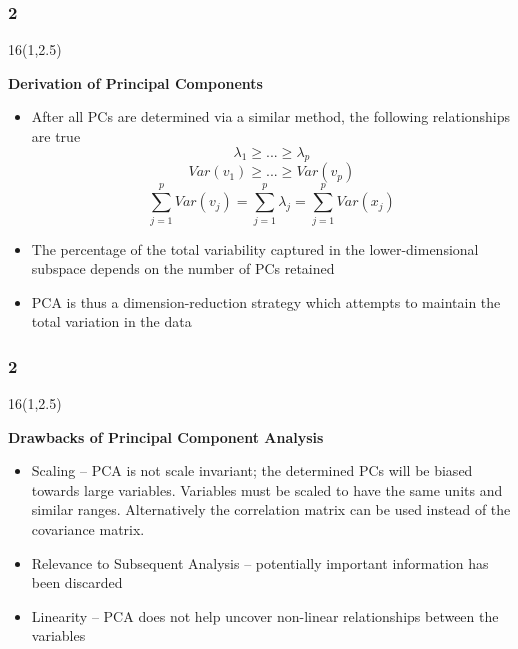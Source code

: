 \documentclass{beamer}
\newcommand\FrameText[1]{
\begin{textblock}{16}(1,2.5)
\raggedright #1
\end{textblock}}
\begin{document}
\begin{frame}
\frametitle{2}
\FrameText{\bf{\large Derivation of Principal Components}}
\begin{itemize}
\item After all PCs are determined via a similar method, the following relationships are true
\begin{equation}
\lambda_1\geq...\geq\lambda_p
\end{equation}
\begin{equation}
Var(v_1)\geq...\geq Var(v_p)
\end{equation}
\begin{equation}
\sum\limits_{j=1}^p Var(v_j)=\sum\limits_{j=1}^p\lambda_j=\sum\limits_{j=1}^p Var(x_j)
\end{equation}
\item The percentage of the total variability captured in the lower-dimensional subspace depends on the number of PCs retained
\item PCA is thus a dimension-reduction strategy which attempts to maintain the total variation in the data
\end{itemize}
\end{frame}

\begin{frame}
\frametitle{2}
\FrameText{\bf{\large Drawbacks of Principal Component Analysis}}
\begin{itemize}
\item Scaling -- PCA is not scale invariant; the determined PCs will be biased towards large variables. Variables must be scaled to have the same units and similar ranges. Alternatively the correlation matrix can be used instead of the covariance matrix.
\item Relevance to Subsequent Analysis -- potentially important information has been discarded
\item Linearity -- PCA does not help uncover non-linear relationships between the variables
\end{itemize}
\end{frame}
\end{document}
